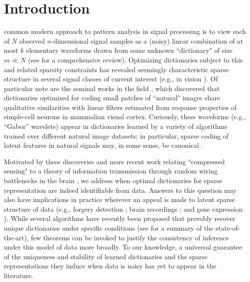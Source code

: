 \documentclass[journal, twocolumn]{IEEEtran}
\begin{document}
\section{Introduction}\label{Intro}
common modern approach to pattern analysis in signal processing is to view each of $N$ observed $n$-dimensional signal samples as a (noisy) linear combination of at most $k$ elementary waveforms drawn from some unknown ``dictionary" of size $m \ll N$ (see \cite{Zhang15} for a comprehensive review). 
Optimizing dictionaries subject to this and related sparsity constraints has revealed seemingly characteristic sparse structure in several signal classes of current interest (e.g., in vision \cite{wang2015sparse}). 
Of particular note are the seminal works in the field \cite{Olshausen96, hurri1996image, bell1997independent, van1998independent}, which discovered that dictionaries optimized for coding small patches of ``natural" images share qualitative similarities with linear filters estimated from response properties of simple-cell neurons in mammalian visual cortex. Curiously, these waveforms (e.g., ``Gabor'' wavelets) appear in dictionaries learned by a variety of algorithms trained over different natural image datasets; in particular, sparse coding of  latent features in natural signals may, in some sense, be canonical \cite{donoho2001can}.

Motivated by these discoveries and more recent work relating ``compressed sensing" to a theory of information transmission through random wiring bottlenecks in the brain \cite{Isely10}, we address when optimal dictionaries for sparse representation are indeed identifiable from data. Answers to this question may also have implications in practice wherever an appeal is made to latent sparse structure of data (e.g., forgery detection \cite{hughes2010, olshausen2010applied}; brain recordings \cite{jung2001imaging, agarwal2014spatially, lee2016sparse}; and gene expression \cite{wu2016stability}). While several algorithms have recently been proposed that provably recover unique dictionaries under specific conditions (see \cite[Sec.~I-E]{Sun16} for a summary of the state-of-the-art), few theorems can be invoked to justify the consistency of inference under this model of data more broadly. To our knowledge, a universal guarantee of the uniqueness and stability of learned dictionaries and the sparse representations they induce when data is noisy has yet to appear in the literature.
\end{document}

